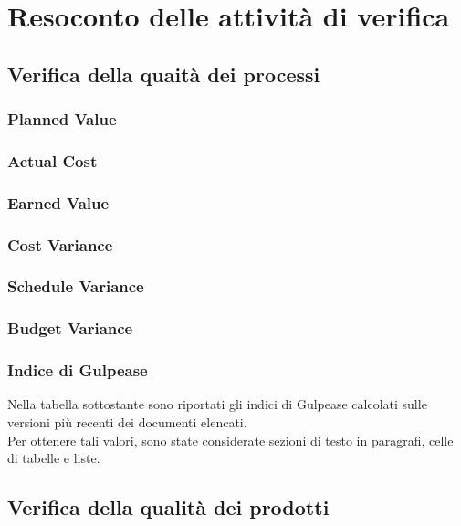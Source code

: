 \section{Resoconto delle attività di verifica}

\subsection{Verifica della quaità dei processi}

\subsubsection{Planned Value}

\subsubsection{Actual Cost}

\subsubsection{Earned Value}

\subsubsection{Cost Variance}

\subsubsection{Schedule Variance}

\subsubsection{Budget Variance}

\subsubsection{Indice di Gulpease}
Nella tabella sottostante sono riportati gli indici di Gulpease calcolati sulle versioni più recenti dei documenti elencati.\\
Per ottenere tali valori, sono state considerate sezioni di testo in paragrafi, celle di tabelle e liste.



\subsection{Verifica della qualità dei prodotti}


